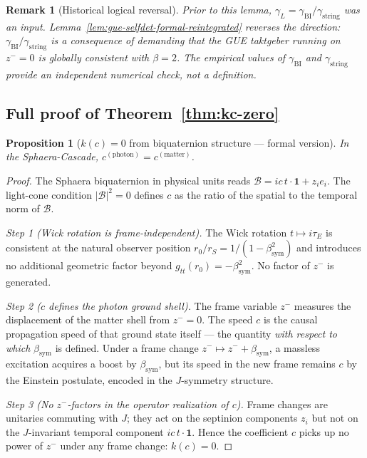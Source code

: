 \documentclass[12pt,a4paper]{article}
\newtheorem{proposition}[theorem]{Proposition}
\newtheorem*{remark}{Remark}
\newcommand{\bsym}{\beta_{\mathrm{sym}}}
\newcommand{\gL}{\gamma_L}
\newcommand{\gstring}{\gamma_{\mathrm{string}}}
\newcommand{\gBI}{\gamma_{\mathrm{BI}}}
\newcommand{\zminus}{z^-}
\begin{document}
\begin{remark}[Historical logical reversal]
Prior to this lemma, $\gL=\gBI/\gstring$ was an \emph{input}.
Lemma~\ref{lem:gue-selfdet-formal-reintegrated} reverses the direction:
$\gBI/\gstring$ is a \emph{consequence} of demanding that the GUE
taktgeber running on $\zminus=0$ is globally consistent with $\beta=2$.
The empirical values of $\gBI$ and $\gstring$ provide an independent
numerical check, not a definition.
\end{remark}

\subsection{Full proof of Theorem~\ref{thm:kc-zero}}
\label{app:kc-zero-reintegrated}

\begin{proposition}[$k(c)=0$ from biquaternion structure --- formal version]
In the Sphaera-Cascade, $c^{(\mathrm{photon})}=c^{(\mathrm{matter})}$.
\end{proposition}

\begin{proof}
The Sphaera biquaternion in physical units reads
$\mathcal{B} = ic\,t\cdot\mathbf{1}+z_i e_i$.
The light-cone condition $|\mathcal{B}|^2=0$ defines $c$ as the ratio
of the spatial to the temporal norm of $\mathcal{B}$.

\emph{Step 1 (Wick rotation is frame-independent).}
The Wick rotation $t\mapsto i\tau_E$ is consistent at the natural
observer position $r_0/r_S=1/(1-\bsym^2)$ and introduces no additional
geometric factor beyond $g_{tt}(r_0)=-\bsym^2$.
No factor of $\zminus$ is generated.

\emph{Step 2 ($c$ defines the photon ground shell).}
The frame variable $\zminus$ measures the displacement of the matter
shell from $\zminus=0$.
The speed $c$ is the causal propagation speed of that ground state
itself --- the quantity \emph{with respect to which} $\bsym$ is defined.
Under a frame change $\zminus\mapsto\zminus+\bsym$, a massless excitation
acquires a boost by $\bsym$, but its speed in the new frame remains $c$
by the Einstein postulate, encoded in the $J$-symmetry structure.

\emph{Step 3 (No $\zminus$-factors in the operator realization of $c$).}
Frame changes are unitaries commuting with $J$; they act on the septinion
components $z_i$ but not on the $J$-invariant temporal component
$ic\,t\cdot\mathbf{1}$.
Hence the coefficient $c$ picks up no power of $\zminus$ under any
frame change: $k(c)=0$.
\end{proof}
\end{document}
